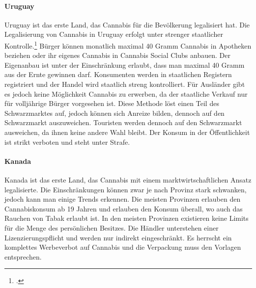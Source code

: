 \documentclass[../main.tex]{subfiles}
\begin{document}
	 \paragraph{Uruguay}
	 Uruguay ist das erste Land, das Cannabis für die Bevölkerung legalisiert hat.
	 Die Legalisierung von Cannabis in Uruguay erfolgt unter strenger staatlicher Kontrolle.\footcite{fijnaut}
	 Bürger können monatlich maximal 40 Gramm Cannabis in Apotheken beziehen oder ihr eigenes Cannabis in Cannabis Social Clubs anbauen.
	 Der Eigenanbau ist unter der Einschränkung erlaubt, dass man maximal 40 Gramm aus der Ernte gewinnen darf.
	 Konsumenten werden in staatlichen Registern registriert und der Handel wird staatlich streng kontrolliert.
	 Für Ausländer gibt es jedoch keine Möglichkeit Cannabis zu erwerben, da der staatliche Verkauf nur für volljährige Bürger vorgesehen ist.
	 Diese Methode löst einen Teil des Schwarzmarktes auf, jedoch können sich Anreize bilden, dennoch auf den Schwarzmarkt auszuweichen. 
	 Touristen werden dennoch auf den Schwarzmarkt ausweichen, da ihnen keine andere Wahl bleibt.
	 Der Konsum in der Öffentlichkeit ist strikt verboten und steht unter Strafe.
	 	 
	 
	 \paragraph{Kanada}
	 Kanada ist das erste Land, das Cannabis mit einem marktwirtschaftlichen Ansatz legalisierte.
	 Die Einschränkungen können zwar je nach Provinz stark schwanken, jedoch kann man einige Trends erkennen.
	 Die meisten Provinzen erlauben den Cannabiskonsum ab 19 Jahren und erlauben den Konsum überall, wo auch das Rauchen von Tabak erlaubt ist.
	 In den meisten Provinzen existieren keine Limits für die Menge des persönlichen Besitzes.
	 Die Händler unterstehen einer Lizenzierungspflicht und werden nur indirekt eingeschränkt. 
	 Es herrscht ein komplettes Werbeverbot auf Cannabis und die Verpackung muss den Vorlagen entsprechen.
	
\end{document}
